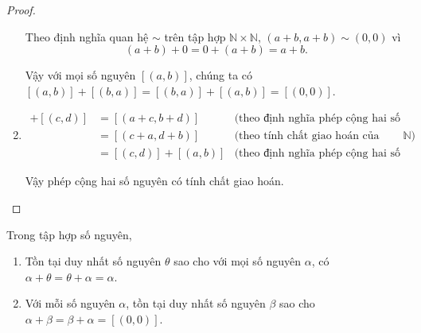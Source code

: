\begin{proof}
\begin{enumerate}[label={(\roman*)}]
		      Theo định nghĩa quan hệ $\sim$ trên tập hợp $\mathbb{N}\times\mathbb{N}$, $(a+b, a+b)\sim (0, 0)$ vì
		      \[
			      (a+b) + 0 = 0 + (a+b) = a+b.
		      \]

		      Vậy với mọi số nguyên $[(a, b)]$, chúng ta có $[(a, b)] + [(b, a)] = [(b, a)] + [(a, b)] = [(0, 0)]$.
		\item \begin{align*}
			      [(a, b)] + [(c, d)] & = [(a+c, b+d)]        & \text{(theo định nghĩa phép cộng hai số nguyên)}                  \\
			                          & = [(c+a, d+b)]        & \text{(theo tính chất giao hoán của phép cộng trên $\mathbb{N}$)} \\
			                          & = [(c, d)] + [(a, b)] & \text{(theo định nghĩa phép cộng hai số nguyên)}
		      \end{align*}

		      Vậy phép cộng hai số nguyên có tính chất giao hoán.
	\end{enumerate}
\end{proof}

\begin{theorem}\label{theorem:uniqueness-of-additive-identity-and-additive-inverse}
	Trong tập hợp số nguyên,
	\begin{enumerate}[label={(\roman*)}]
		\item Tồn tại duy nhất số nguyên $\theta$ sao cho với mọi số nguyên $\alpha$, có $\alpha + \theta = \theta + \alpha = \alpha$.
		\item Với mỗi số nguyên $\alpha$, tồn tại duy nhất số nguyên $\beta$ sao cho $\alpha + \beta = \beta + \alpha = [(0,0)]$.
	\end{enumerate}
\end{theorem}

